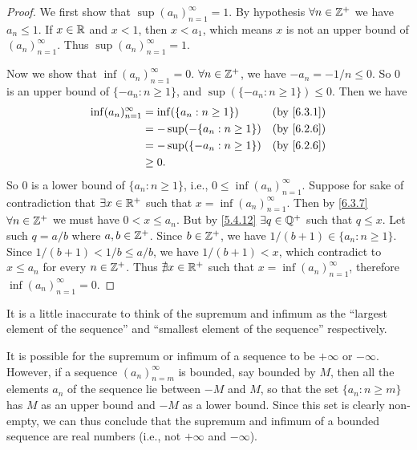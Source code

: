 \begin{proof}
  We first show that \(\sup(a_n)_{n = 1}^\infty = 1\).
  By hypothesis \(\forall n \in \mathbb{Z}^+\) we have \(a_n \leq 1\).
  If \(x \in \mathbb{R}\) and \(x < 1\), then \(x < a_1\), which means \(x\) is not an upper bound of \((a_n)_{n = 1}^\infty\).
  Thus \(\sup(a_n)_{n = 1}^\infty = 1\).

  Now we show that \(\inf(a_n)_{n = 1}^\infty = 0\).
  \(\forall n \in \mathbb{Z}^+\), we have \(-a_n = -1 / n \leq 0\).
  So \(0\) is an upper bound of \(\{-a_n : n \geq 1\}\), and \(\sup(\{-a_n : n \geq 1\}) \leq 0\).
  Then we have
  \begin{align*}
    \inf(a_n)_{n = 1}^\infty & = \inf(\{a_n : n \geq 1\})   &  & \by{6.3.1} \\
                             & = -\sup(-\{a_n : n \geq 1\}) &  & \by{6.2.6} \\
                             & = -\sup(\{-a_n : n \geq 1\}) &  & \by{6.2.6} \\
                             & \geq 0.
  \end{align*}
  So \(0\) is a lower bound of \(\{a_n : n \geq 1\}\), i.e., \(0 \leq \inf(a_n)_{n = 1}^\infty\).
  Suppose for sake of contradiction that \(\exists x \in \mathbb{R}^+\) such that \(x = \inf(a_n)_{n = 1}^\infty\).
  Then by \cref{6.3.7} \(\forall n \in \mathbb{Z}^+\) we must have \(0 < x \leq a_n\).
  But by \cref{5.4.12} \(\exists q \in \mathbb{Q}^+\) such that \(q \leq x\).
  Let such \(q = a / b\) where \(a, b \in \mathbb{Z}^+\).
  Since \(b \in \mathbb{Z}^+\), we have \(1 / (b + 1) \in \{a_n : n \geq 1\}\).
  Since \(1 / (b + 1) < 1 / b \leq a / b\), we have \(1 / (b + 1) < x\), which contradict to \(x \leq a_n\) for every \(n \in \mathbb{Z}^+\).
  Thus \(\nexists x \in \mathbb{R}^+\) such that \(x = \inf(a_n)_{n = 1}^\infty\), therefore \(\inf(a_n)_{n = 1}^\infty = 0\).
\end{proof}

\begin{note}
  It is a little inaccurate to think of the supremum and infimum as the ``largest element of the sequence'' and ``smallest element of the sequence'' respectively.
\end{note}

\begin{note}
  It is possible for the supremum or infimum of a sequence to be \(+\infty\) or \(-\infty\).
  However, if a sequence \((a_n)_{n = m}^\infty\) is bounded, say bounded by \(M\), then all the elements \(a_n\) of the sequence lie between \(-M\) and \(M\), so that the set \(\{a_n : n \geq m\}\) has \(M\) as an upper bound and \(-M\) as a lower bound.
  Since this set is clearly non-empty, we can thus conclude that the supremum and infimum of a bounded sequence are real numbers (i.e., not \(+\infty\) and \(-\infty\)).
\end{note}

